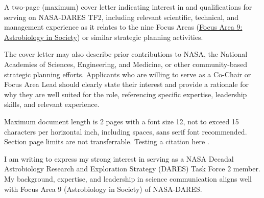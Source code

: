 \documentclass[12pt]{article}
\begin{document}
% 

A two-page (maximum) cover letter indicating interest in and qualifications for serving on NASA-DARES TF2, including relevant scientific, technical, and management experience as it relates to the nine Focus Areas (\href{https://assets.science.nasa.gov/content/dam/science/psd/astrobiology/for-researchers/dares/9.%20Astrobiology%20in%20Society.pdf}{Focus Area 9: Astrobiology in Society}) or similar strategic planning activities. 

The cover letter may also describe prior contributions to NASA, the National Academies of Sciences, Engineering, and Medicine, or other community-based strategic planning efforts. Applicants who are willing to serve as a Co-Chair or Focus Area Lead should clearly state their interest and provide a rationale for why they are well suited for the role, referencing specific expertise, leadership skills, and relevant experience.

Maximum document length is 2 pages with a font size 12, not to exceed 15 characters per horizontal inch, including spaces, sans serif font recommended. Section page limits are not transferrable. Testing a citation here \parencite{yeoHumorCanIncrease2022}.

I am writing to express my strong interest in serving as a NASA Decadal Astrobiology Research and Exploration Strategy (DARES) Task Force 2 member. My background, expertise, and leadership in science communication aligns well with Focus Area 9 (Astrobiology in Society) of NASA-DARES.


\end{document}
